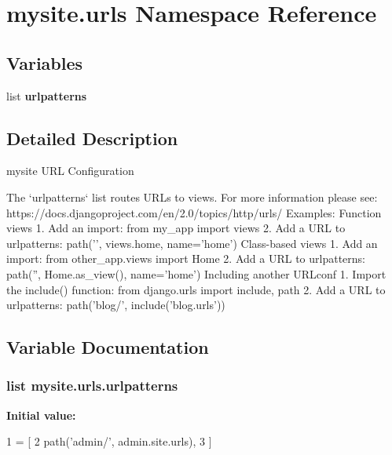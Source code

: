 \hypertarget{namespacemysite_1_1urls}{\section{mysite.\-urls Namespace Reference}
\label{namespacemysite_1_1urls}
}
\subsection*{Variables}
\begin{DoxyCompactItemize}
\item 
list {\bfseries urlpatterns}
\end{DoxyCompactItemize}


\subsection{Detailed Description}
\begin{DoxyVerb}mysite URL Configuration

The `urlpatterns` list routes URLs to views. For more information please see:
https://docs.djangoproject.com/en/2.0/topics/http/urls/
Examples:
Function views
1. Add an import:  from my_app import views
2. Add a URL to urlpatterns:  path('', views.home, name='home')
Class-based views
1. Add an import:  from other_app.views import Home
2. Add a URL to urlpatterns:  path('', Home.as_view(), name='home')
Including another URLconf
1. Import the include() function: from django.urls import include, path
2. Add a URL to urlpatterns:  path('blog/', include('blog.urls'))
\end{DoxyVerb}
 

\subsection{Variable Documentation}
\hypertarget{namespacemysite_1_1urls_a0ee3882cce96849684991a17cb2b04b6}{
\subsubsection[{urlpatterns}]{\setlength{\rightskip}{0pt plus 5cm}list mysite.\-urls.\-urlpatterns}}\label{namespacemysite_1_1urls_a0ee3882cce96849684991a17cb2b04b6}
{\bfseries Initial value\-:}
\begin{DoxyCode}
1 = [
2     path(\textcolor{stringliteral}{'admin/'}, admin.site.urls),
3 ]
\end{DoxyCode}

